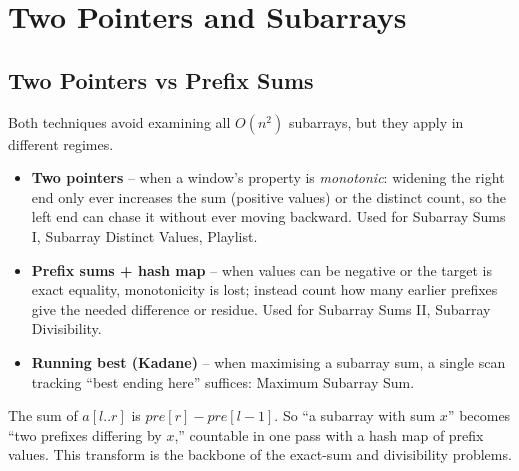 \chapter{Two Pointers and Subarrays}

\section{Two Pointers vs Prefix Sums}
\label{sec:cses-tp-intro}

Both techniques avoid examining all $O(n^2)$ subarrays, but they apply in
different regimes.

\begin{patternbox}
\begin{itemize}
  \item \textbf{Two pointers} -- when a window's property is
        \emph{monotonic}: widening the right end only ever increases the
        sum (positive values) or the distinct count, so the left end can
        chase it without ever moving backward. Used for Subarray Sums I,
        Subarray Distinct Values, Playlist.
  \item \textbf{Prefix sums + hash map} -- when values can be negative or
        the target is exact equality, monotonicity is lost; instead count
        how many earlier prefixes give the needed difference or residue.
        Used for Subarray Sums II, Subarray Divisibility.
  \item \textbf{Running best (Kadane)} -- when maximising a subarray sum,
        a single scan tracking ``best ending here'' suffices: Maximum
        Subarray Sum.
  \end{itemize}
\end{patternbox}

\begin{ideabox}
The sum of $a[l..r]$ is $\textit{pre}[r]-\textit{pre}[l-1]$. So ``a subarray
with sum $x$'' becomes ``two prefixes differing by $x$,'' countable in one
pass with a hash map of prefix values. This transform is the backbone of
the exact-sum and divisibility problems.
\end{ideabox}

\newpage







